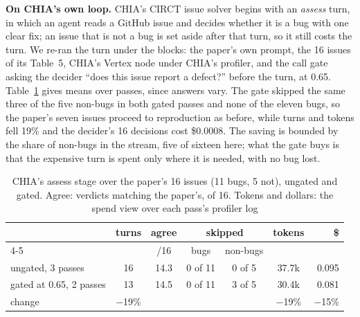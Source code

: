 \documentclass[conference]{IEEEtran}
\begin{document}
\textbf{On CHIA's own loop.} CHIA's CIRCT issue solver begins with an \emph{assess} turn, in
which an agent reads a GitHub issue and decides whether it is a bug with one clear fix; an issue
that is not a bug is set aside after that turn, so it still costs the turn. We re-ran the turn
under the blocks: the paper's own prompt, the 16 issues of its Table~5, CHIA's Vertex node under
CHIA's profiler, and the call gate asking the decider ``does this issue report a defect?'' before
the turn, at 0.65. Table~\ref{tab:circt} gives means over passes, since answers vary. The gate
skipped the same three of the five non-bugs in both gated passes and none of the eleven bugs, so
the paper's seven issues proceed to reproduction as before, while turns and tokens fell 19\% and
the decider's 16 decisions cost \$0.0008. %
The saving is bounded by the share of non-bugs in the stream, five of sixteen here; what the gate
buys is that the expensive turn is spent only where it is needed, with no bug lost.

\begin{table}[!t]
\caption{CHIA's assess stage over the paper's 16 issues (11 bugs, 5 not), ungated and gated.
Agree: verdicts matching the paper's, of 16. Tokens and dollars: the spend view over each pass's
profiler log}
\label{tab:circt}
\centering
\scriptsize
\renewcommand{\arraystretch}{0.92}
\begin{tabular}{@{}l@{\hspace{5pt}}c@{\hspace{5pt}}c@{\hspace{5pt}}c@{\hspace{5pt}}c@{\hspace{5pt}}c@{\hspace{5pt}}r@{}}
\toprule
 & \textbf{turns} & \textbf{agree} & \multicolumn{2}{c}{\textbf{skipped}} & \textbf{tokens} & \textbf{\$} \\
\cmidrule(lr){4-5}
 & & /16 & bugs & non-bugs & & \\
\midrule
ungated, 3 passes & 16 & 14.3 & 0 of 11 & 0 of 5 & 37.7k & 0.095 \\
gated at 0.65, 2 passes & 13 & 14.5 & 0 of 11 & 3 of 5 & 30.4k & 0.081 \\
change & $-$19\% & & & & $-$19\% & $-$15\% \\
\bottomrule
\end{tabular}
\end{table}
\end{document}
